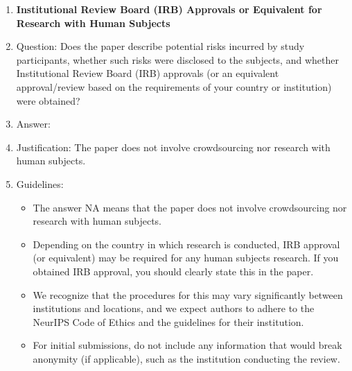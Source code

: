 \documentclass{article}
\begin{document}
\begin{enumerate}
\item {\bf Institutional Review Board (IRB) Approvals or Equivalent for Research with Human Subjects}
    \item[] Question: Does the paper describe potential risks incurred by study participants, whether such risks were disclosed to the subjects, and whether Institutional Review Board (IRB) approvals (or an equivalent approval/review based on the requirements of your country or institution) were obtained?
    \item[] Answer: \answerNA{} %
    \item[] Justification: The paper does not involve crowdsourcing nor research with human subjects.
    \item[] Guidelines:
    \begin{itemize}
        \item The answer NA means that the paper does not involve crowdsourcing nor research with human subjects.
        \item Depending on the country in which research is conducted, IRB approval (or equivalent) may be required for any human subjects research. If you obtained IRB approval, you should clearly state this in the paper. 
        \item We recognize that the procedures for this may vary significantly between institutions and locations, and we expect authors to adhere to the NeurIPS Code of Ethics and the guidelines for their institution. 
        \item For initial submissions, do not include any information that would break anonymity (if applicable), such as the institution conducting the review.
    \end{itemize}

\end{enumerate}
%

%
\end{document}
